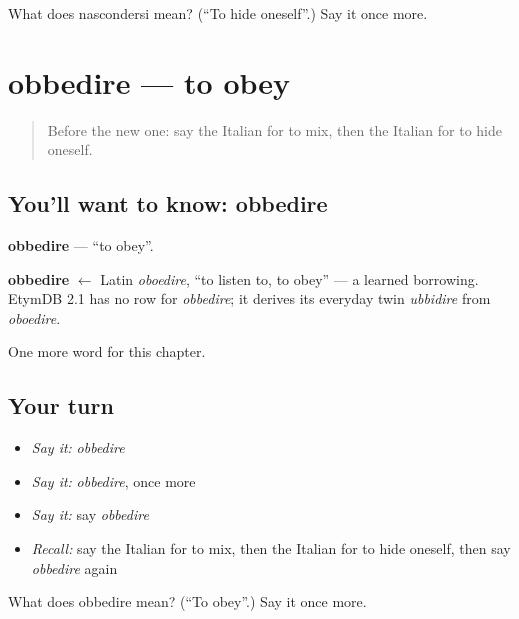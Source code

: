 \begin{tcolorbox}[breakable,colback=teal!4,colframe=teal!35!black,title={Before you move on}]
What does nascondersi mean? (\textquotedblleft{}To hide oneself\textquotedblright{}.) Say it once more.
\end{tcolorbox}
\section[obbedire]{obbedire — to obey}

\label{lesson:IT-C213-obbedire}



\begin{quote}
Before the new one: say the Italian for to mix, then the Italian for to hide oneself.
\end{quote}

\subsection*{You'll want to know: obbedire}
\textbf{obbedire} — \textquotedblleft{}to obey\textquotedblright{}.

\begin{cousinweb}
\textbf{obbedire} $\leftarrow$ Latin \emph{oboedire}, \textquotedblleft{}to listen to, to obey\textquotedblright{} — a learned borrowing. EtymDB 2.1 has no row for \emph{obbedire}; it derives its everyday twin \emph{ubbidire} from \emph{oboedire}.
\end{cousinweb}

\begin{grammarlens}[title={What you've built}]
One more word for this chapter.
\end{grammarlens}

\subsection*{Your turn}
\begin{itemize}
\raggedright
  \item \emph{Say it:} \emph{obbedire}
  \item \emph{Say it:} \emph{obbedire}, once more
  \item \emph{Say it:} say \emph{obbedire}
  \item \emph{Recall:} say the Italian for to mix, then the Italian for to hide oneself, then say \emph{obbedire} again
\end{itemize}

\begin{tcolorbox}[breakable,colback=teal!4,colframe=teal!35!black,title={Before you move on}]
What does obbedire mean? (\textquotedblleft{}To obey\textquotedblright{}.) Say it once more.
\end{tcolorbox}
